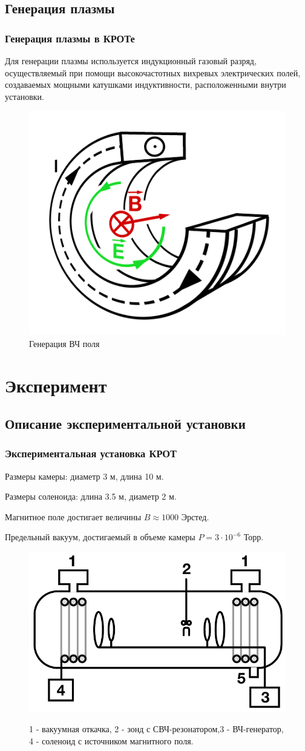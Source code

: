 \documentclass[10pt,pdf,hyperref={unicode}, dvipsnames]{beamer}
\begin{document}
\subsection{Генерация плазмы}
\begin{frame}
	\frametitle{Генерация плазмы в КРОТе}

		Для генерации плазмы используется индукционный газовый разряд, осуществляемый при помощи высокочастотных вихревых электрических
	полей, создаваемых мощными катушками индуктивности, расположенными внутри установки.
	\begin{figure}[H]
		\begin{minipage}{\linewidth}
				\centering
				\includegraphics[width=0.4\linewidth]{fig/induct}
				\caption{Генерация ВЧ поля}
				\label{fig:resonator}
		\end{minipage}
		\end{figure}
\end{frame}
\section{Эксперимент}
\subsection{Описание экспериментальной установки}
\begin{frame}
	\frametitle{Экспериментальная установка КРОТ}
	Размеры камеры: диаметр 3 м, длина 10 м.

	Размеры соленоида: длина 3.5 м, диаметр 2 м. 
	
	Магнитное поле достигает величины $B\approx 1000$ Эрстед. 
	
	Предельный вакуум, достигаемый в объеме камеры $P =3\cdot10^{-6}$ Торр. 
	\begin{figure}[tb]
		\vspace{0pt}
		\centering
		\includegraphics[width=0.6\linewidth]{fig/krot}
		\label{fig:krot}
		\caption{1 - вакуумная откачка, 2 - зонд с СВЧ-резонатором,3 - ВЧ-генератор, 4 - соленоид с источником магнитного поля.}
	\end{figure}
\end{frame}
\end{document}
